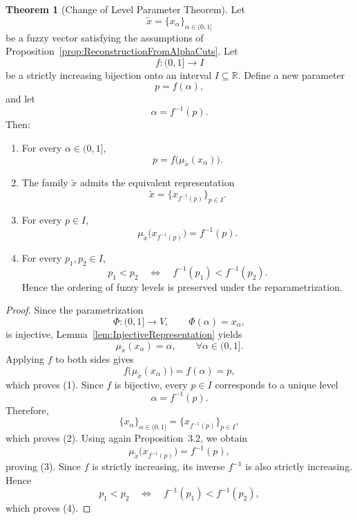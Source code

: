 \documentclass[preprint,12pt]{elsarticle}
\theoremstyle{definition}
\newtheorem{theorem}{Theorem}[section]
\begin{document}
\begin{theorem}[Change of Level Parameter Theorem]
	Let
	\[
	\widetilde{x}=\{x_\alpha\}_{\alpha\in(0,1]}
	\]
	be a fuzzy vector satisfying the assumptions of Proposition~\ref{prop:ReconstructionFromAlphaCuts}. Let
	\[
	f:(0,1]\longrightarrow I
	\]
	be a strictly increasing bijection onto an interval
	\(I\subseteq \mathbb{R}\).
	Define a new parameter
	\[
	p=f(\alpha),
	\]
	and let
	\[
	\alpha=f^{-1}(p).
	\]Then:
	
	\begin{enumerate}
		\item For every $\alpha\in(0,1]$,
		\[
		p=f\bigl(\mu_{\widetilde{x}}(x_\alpha)\bigr).
		\]
		
		\item The family $\widetilde{x}$ admits the equivalent representation
		\[
		\widetilde{x}
		=
		\{x_{f^{-1}(p)}\}_{p\in I}.
		\]
		\item For every $p\in I$,
		\[
		\mu_{\widetilde{x}}
		\bigl(x_{f^{-1}(p)}\bigr)
		=
		f^{-1}(p).
		\]
		
		\item For every $p_1,p_2\in I$,
		\[
		p_1<p_2
		\quad\Longleftrightarrow\quad
		f^{-1}(p_1)<f^{-1}(p_2).
		\]
		Hence the ordering of fuzzy levels is preserved under the
		reparametrization.
	\end{enumerate}
\end{theorem}

\begin{proof}
	Since the parametrization
	\[
	\Phi:(0,1]\to V,
	\qquad
	\Phi(\alpha)=x_\alpha,
	\]
	is injective, Lemma~\ref{lem:InjectiveRepresentation} yields
	\[
	\mu_{\widetilde{x}}(x_\alpha)=\alpha,
	\qquad
	\forall \alpha\in(0,1].
	\]
	Applying $f$ to both sides gives
	\[
	f\bigl(\mu_{\widetilde{x}}(x_\alpha)\bigr)
	=
	f(\alpha)
	=
	p,
	\]
	which proves (1).
	Since $f$ is bijective, every $p\in I$ corresponds to a unique level
	\[
	\alpha=f^{-1}(p).
	\]
	Therefore,
	\[
	\{x_\alpha\}_{\alpha\in(0,1]}
	=
	\{x_{f^{-1}(p)}\}_{p\in I},
	\]
	which proves (2).
	Using again Proposition~3.2, we obtain
	\[
	\mu_{\widetilde{x}}
	\bigl(x_{f^{-1}(p)}\bigr)
	=
	f^{-1}(p),
	\]
	proving (3).
	Since $f$ is strictly increasing, its inverse $f^{-1}$ is also strictly
	increasing. Hence
	\[
	p_1<p_2
	\quad\Longleftrightarrow\quad
	f^{-1}(p_1)<f^{-1}(p_2),
	\]
	which proves (4).
\end{proof}
\end{document}
